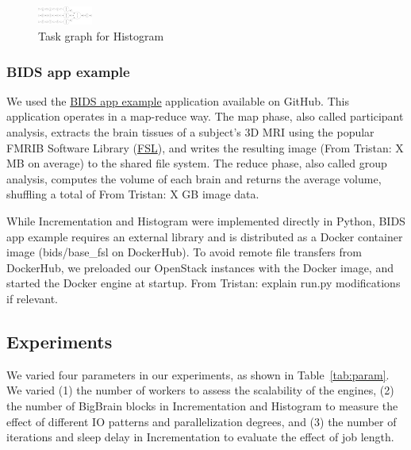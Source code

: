 \documentclass[conference]{IEEEtran}
\newcommand{\TG}[1]{\color{cyan}From Tristan: #1 \color{black}}
\begin{document}
\begin{figure}[!t]
    \centering
    \includegraphics[width=0.16\textwidth, angle=-90]{images/histogram-task-graph.png}
    \caption{Task graph for Histogram}\label{fig:tg-histo}
\end{figure}

\subsubsection{BIDS app example}

We used the \href{https://github.com/BIDS-Apps/example}{BIDS app example}
application available on GitHub. This application operates in a map-reduce
way. The map phase, also called participant analysis, extracts the brain
tissues of a subject's 3D MRI using the popular FMRIB Software Library
(\href{https://fsl.fmrib.ox.ac.uk/fsl/fslwiki}{FSL}), and writes the
resulting image (\TG{X}MB on average) to the shared file system. The reduce
phase, also called group analysis, computes the volume of each brain and
returns the average volume, shuffling a total of \TG{X}GB image data.

While Incrementation and Histogram were implemented directly in Python,
BIDS app example requires an external library and is distributed as a
Docker container image (bids/base\_fsl on DockerHub). To avoid remote file
transfers from DockerHub, we preloaded our OpenStack instances with the
Docker image, and started the Docker engine at startup. \TG{explain run.py modifications if relevant.}

\subsection{Experiments}

We varied four parameters in our experiments, as shown in
Table~\ref{tab:param}. We varied (1) the number of workers to assess the
scalability of the engines, (2) the number of BigBrain blocks in
Incrementation and Histogram to measure the effect of different IO patterns
and parallelization degrees, and (3) the number of iterations and sleep
delay in Incrementation to evaluate the effect of job length.

\end{document}
